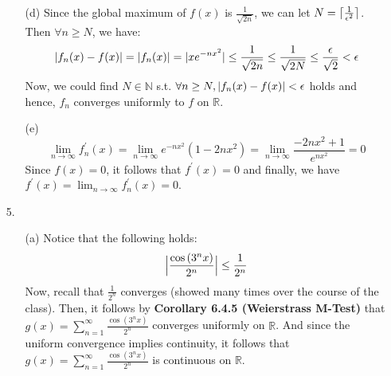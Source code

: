 \documentclass[11pt]{article}
\DeclarePairedDelimiter\abs{\lvert}{\rvert}%
\DeclarePairedDelimiter\absb{\Big\lvert}{\Big\rvert}%
\DeclarePairedDelimiter{\ceil}{\lceil}{\rceil}
\newcommand{\nats}{\mathbb{N}}
\newcommand{\reals}{\mathbb{R}}
\begin{document}
\begin{itemize}
\begin{itemize}
            \item[(d)]
                Since the global maximum of $f(x)$ is $\frac{1}{\sqrt{2n}}$, we
                can let $N = \ceil{\frac{1}{\epsilon^2}}$. Then $\forall n \geq
                N$, we have:
                \begin{equation*}
                    \abs{f_n(x) - f(x)}
                        = \abs{f_n(x)}
                        = \abs{xe^{-nx^2}}
                        \leq \frac{1}{\sqrt{2n}}
                        \leq \frac{1}{\sqrt{2N}}
                        \leq \frac{\epsilon}{\sqrt{2}}
                        < \epsilon
                \end{equation*}
                Now, we could find $N \in \nats$ s.t. $\forall n \geq N,
                \abs{f_n(x) - f(x)} < \epsilon$ holds and hence, $f_n$
                converges uniformly to $f$ on $\reals$.

            \item[(e)]
                \begin{equation*}
                    \lim_{n \to \infty} f^\prime_n(x)
                        = \lim_{n \to \infty} e^{-nx^2}(1 - 2nx^2)
                        = \lim_{n \to \infty} \frac{- 2nx^2 + 1}{e^{nx^2}}
                        = 0
                        \tag{notice that as $n \to \infty, e^n$ grows a lot
                             faster than $2n$}
                \end{equation*}
                Since $f(x) = 0$, it follows that $f^\prime(x) = 0$ and
                finally, we have $f^\prime(x) = \lim_{n \to \infty}
                f^\prime_n(x) = 0$.
        \end{itemize}

    \item[5.]
        \begin{itemize}
            \item[(a)]
                Notice that the following holds:
                \begin{equation*}
                    \absb{\frac{\cos{(3^nx)}}{2^n}} \leq \frac{1}{2^n}
                \end{equation*}
                Now, recall that $\frac{1}{2^n}$ converges (showed many times
                over the course of the class). Then, it follows by
                \textbf{Corollary 6.4.5 (Weierstrass M-Test)} that $g(x) =
                \sum_{n = 1}^\infty \frac{\cos{(3^nx)}}{2^n}$ converges
                uniformly on $\reals$. And since the uniform convergence
                implies continuity, it follows that $g(x) = \sum_{n = 1}^\infty
                \frac{\cos{(3^nx)}}{2^n}$ is continuous on $\reals$.


\end{itemize}
\end{itemize}
\end{document}
